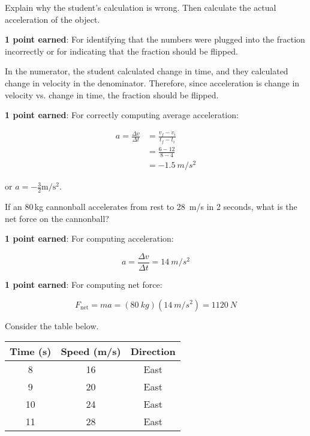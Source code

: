 \documentclass[answers]{exam}
\begin{document}
\begin{questions}
Explain why the student's calculation is wrong. Then calculate the actual acceleration of the object.

\begin{solutionorbox}[6cm]
\phantom{.}

\textbf{1 point earned}: For identifying that the numbers were plugged into the fraction incorrectly or for indicating that the fraction should be flipped.

In the numerator, the student calculated change in time, and they calculated change in velocity in the denominator. Therefore, since acceleration is change in velocity vs. change in time, the fraction should be flipped.

\textbf{1 point earned}: For correctly computing average acceleration:

\begin{align*}
    a = \frac{\Delta v}{\Delta t} &= \frac{v_f - v_i}{t_f - t_i} \\[1ex]
    &=  \frac{6 - 12}{8 - 4} \\[1ex] 
    &= \boxed{\SI{-1.5}{m/s^2}}
\end{align*}

or $a = -\frac{3}{2} \mathrm{m/s^2}$.
\end{solutionorbox}

\question[2]
If an 80\,kg cannonball accelerates from rest to \SI{28}{m/s} in 2 seconds, what is the net force on the cannonball?

\begin{solutionorbox}[6cm]
\phantom{.}

\textbf{1 point earned}: For computing acceleration:

\begin{equation*}
    a = \frac{\Delta v}{\Delta t} = \SI{14}{m/s^2}
\end{equation*}

\textbf{1 point earned}: For computing net force:

\begin{equation*}
    F_\mathrm{net} = ma = (\SI{80}{kg})(\SI{14}{m/s^2}) = \boxed{\SI{1120}{N}}
\end{equation*}
\end{solutionorbox}

\clearpage


\question [2]
Consider the table below.

\begin{center}
    \begin{tabular}{|c|c|c|}
        \hline
        \textbf{Time} (s) & \textbf{Speed} (m/s) & \textbf{Direction} \\ \hline
        8 & 16 & East\\ \hline
        9 & 20 & East\\ \hline
        10 & 24 & East\\ \hline
        11 & 28 & East\\ \hline
    \end{tabular}
\end{center}


\end{questions}
\end{document}
